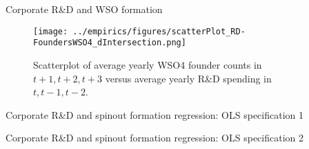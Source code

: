 \documentclass[english,usenames,dvipsnames]{beamer}
\begin{document}
\begin{frame}{Corporate R\&D and WSO formation}

\begin{figure}[!htb]
\centering
\texttt{[image: ../empirics/figures/scatterPlot\_RD-FoundersWSO4\_dIntersection.png]}
\caption{Scatterplot of average yearly WSO4 founder counts in $t+1,t+2,t+3$ versus average yearly R\&D spending in $t,t-1,t-2$.}
\end{figure}
\end{frame}

\begin{frame}{Corporate R\&D and spinout formation regression: OLS specification 1}
\begin{table}
\Tiny
\centering

\caption{\tiny The dependent variable is average yearly number of founders joining startups in years $t+1,t+2,t+3$. The independent variables are averages over $t,t-1,t-2$. Firm controls are employment, assets, intangible assets, investment, net income, cumulative citation-weighted patents, and the product of Tobin's Q and Assets. Standard errors are clustered by firm.}
\end{table}
\end{frame}

\begin{frame}{Corporate R\&D and spinout formation regression: OLS specification 2}
\begin{table}
\Tiny
\centering

\caption{\tiny The dependent variable is the average yearly number of founders from the parent firm joining startups in years $t+1,t+2,t+3$, normalized by a trailing five-year moving average of assets. Independent variables are also normalized by assets. Standard errors are clustered at the firm level.}
\label{table:RDandSpinoutFormation_at_founder2_l3f3}
\end{table}
\end{frame}
\end{document}

